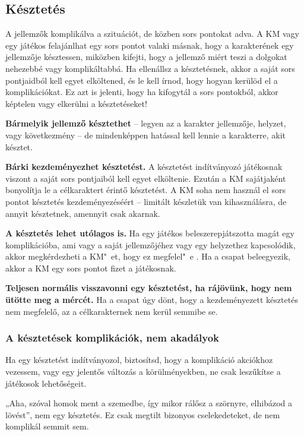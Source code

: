 \subsection{Késztetés}

A jellemzők  komplikálva a szituációt, de közben sors pontokat adva. A KM vagy egy játékos felajánlhat egy sors pontot valaki másnak, hogy a karakterének egy jellemzője késztessen, miközben kifejti, hogy a jellemző miért teszi a dolgokat nehezebbé vagy komplikáltabbá. Ha ellenállsz a késztetésnek, akkor a saját sors pontjaidból kell egyet elköltened, és le kell írnod, hogy hogyan kerülöd el a komplikációkat. Ez azt is jelenti, hogy ha kifogytál a sors pontokból, akkor képtelen vagy elkerülni a késztetéseket!

\textbf{Bármelyik jellemző késztethet} -- legyen az a karakter jellemzője, helyzet, vagy következmény -- de mindenképpen hatással kell lennie a karakterre, akit késztet.

\textbf{Bárki kezdeményezhet késztetést.} A késztetést indítványozó játékosnak viszont a saját sors pontjaiból kell egyet elköltenie. Ezután a KM sajátjaként bonyolítja le a célkaraktert érintő késztetést. A KM soha nem használ el sors pontot késztetés kezdeményezéséért -- limitált készletük van kihasználásra, de annyit késztetnek, amennyit csak akarnak.

\textbf{A késztetés lehet utólagos is.} Ha egy játékos beleszerepjátszotta magát egy komplikációba, ami vagy a saját jellemzőjéhez vagy egy helyzethez kapcsolódik, akkor megkérdezheti a KM"~et, hogy ez megfelel"~e . Ha a csapat beleegyezik, akkor a KM egy sors pontot fizet a játékosnak.

\textbf{Teljesen normális visszavonni egy késztetést, ha rájövünk, hogy nem ütötte meg a mércét.} Ha a csapat úgy dönt, hogy a kezdeményezett késztetés nem megfelelő, az a célkarakternek nem kerül semmibe se.

\subsubsection{A késztetések komplikációk, nem akadályok}

Ha egy késztetést indítványozol, biztosítsd, hogy a komplikáció akciókhoz vezessem, vagy egy jelentős változás a körülményekben, ne csak leszűkítse a játékosok lehetőségeit.

„Aha, szóval homok ment a szemedbe, így mikor rálősz a szörnyre, elhibázod a lövést”, nem egy késztetés. Ez csak megtilt bizonyos cselekedeteket, de nem komplikál semmit sem.


